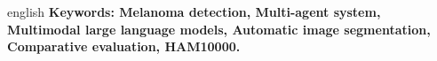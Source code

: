 \begin{resumo}
\begin{otherlanguage*}{english}
\textbf{Keywords: Melanoma detection, Multi-agent system, Multimodal large language models, Automatic image segmentation, Comparative evaluation, HAM10000.}
\end{otherlanguage*}
\end{resumo}
\captionsbrazil
